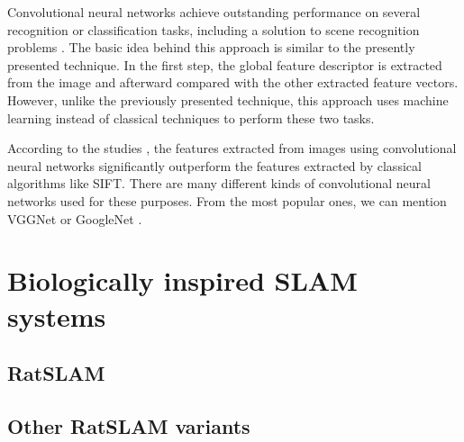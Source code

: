 Convolutional neural networks achieve outstanding performance on several recognition or classification tasks, including a solution to scene recognition problems \parencite{CNNSceneRecognition1} \parencite{CNNSceneRecognition2}. The basic idea behind this approach is similar to the presently presented technique. In the first step, the global feature descriptor is extracted from the image and afterward compared with the other extracted feature vectors. However, unlike the previously presented technique, this approach uses machine learning instead of classical techniques to perform these two tasks.\par
According to the studies \cite{fischer2014descriptor}\cite{Imagenet}, the features extracted from images using convolutional neural networks significantly outperform the features extracted by classical algorithms like SIFT. There are many different kinds of convolutional neural networks used for these purposes. From the most popular ones, we can mention VGGNet \parencite{VggNet} or GoogleNet \parencite{GoogleNet}.

\section{Biologically inspired SLAM systems}\label{section:bioSlam}

\subsection{RatSLAM}\label{section:ratSlamRW}

\subsection{Other RatSLAM variants}\label{section:ratSlamVariants}